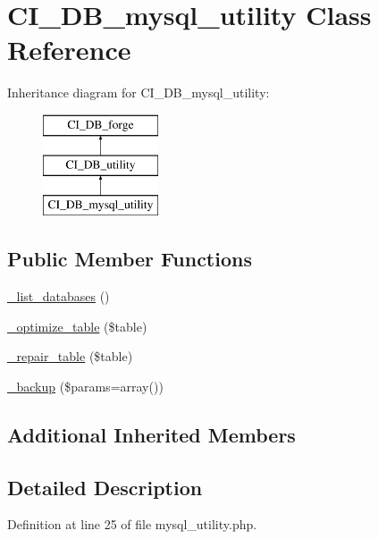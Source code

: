 \hypertarget{class_c_i___d_b__mysql__utility}{\section{C\-I\-\_\-\-D\-B\-\_\-mysql\-\_\-utility Class Reference}
\label{class_c_i___d_b__mysql__utility}
}
Inheritance diagram for C\-I\-\_\-\-D\-B\-\_\-mysql\-\_\-utility\-:\begin{figure}[H]
\begin{center}
\leavevmode
\includegraphics[height=3.000000cm]{class_c_i___d_b__mysql__utility}
\end{center}
\end{figure}
\subsection*{Public Member Functions}
\begin{DoxyCompactItemize}
\item 
\hyperlink{class_c_i___d_b__mysql__utility_aa047e69a7e732ca7280270f87f82bb3a}{\-\_\-list\-\_\-databases} ()
\item 
\hyperlink{class_c_i___d_b__mysql__utility_a4856292816fbbc8e9d927f565766727b}{\-\_\-optimize\-\_\-table} (\$table)
\item 
\hyperlink{class_c_i___d_b__mysql__utility_a7f40d4a3d78917e455e315cf708842ef}{\-\_\-repair\-\_\-table} (\$table)
\item 
\hyperlink{class_c_i___d_b__mysql__utility_a30f3053d2c82e7562349924363507afa}{\-\_\-backup} (\$params=array())
\end{DoxyCompactItemize}
\subsection*{Additional Inherited Members}


\subsection{Detailed Description}


Definition at line 25 of file mysql\-\_\-utility.\-php.



